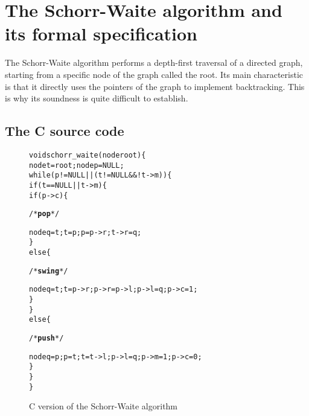 
\section{The Schorr-Waite algorithm and its formal specification}
\label{sec:algo}

The Schorr-Waite algorithm performs a depth-first traversal of a
directed graph, starting from a specific node of the graph called the
root. Its main characteristic is that it directly uses the pointers of
the graph to implement backtracking. This is why its soundness is
quite difficult to establish. 

\subsection{The C source code}

\begin{figure*}[t]
\begin{alltt}
void schorr_waite(node root) \{
  node t = root; node p = NULL;
  while (p != NULL || (t != NULL && ! t->m)) \{
    if (t == NULL || t->m) \{
      if (p->c) \{ \begin{slshape}/* \textbf{pop} */\end{slshape}
        node q = t; t = p; p = p->r; t->r = q;
      \} 
      else \{ \begin{slshape}/* \textbf{swing} */\end{slshape}
        node q = t; t = p->r; p->r = p->l; p->l = q; p->c = 1;
      \}
    \} 
    else \{ \begin{slshape}/* \textbf{push} */ \end{slshape}
      node q = p; p = t; t = t->l; p->l = q; p->m = 1; p->c = 0;
    \}
  \}
\}
\end{alltt}
\caption{C version of the Schorr-Waite algorithm}
\label{fig:code}
\end{figure*}

